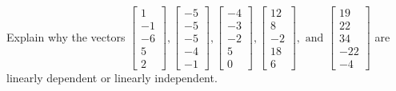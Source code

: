 \documentclass{article}
\begin{document}
\begin{exerciseStatement}
    Explain why the vectors \(\left[\begin{array}{r}
1 \\
-1 \\
-6 \\
5 \\
2
\end{array}\right] , \left[\begin{array}{r}
-5 \\
-5 \\
-5 \\
-4 \\
-1
\end{array}\right] , \left[\begin{array}{r}
-4 \\
-3 \\
-2 \\
5 \\
0
\end{array}\right] , \left[\begin{array}{r}
12 \\
8 \\
-2 \\
18 \\
6
\end{array}\right] , \text{ and } \left[\begin{array}{r}
19 \\
22 \\
34 \\
-22 \\
-4
\end{array}\right]\) are linearly dependent or linearly independent.


  
\end{exerciseStatement}
\end{document}
